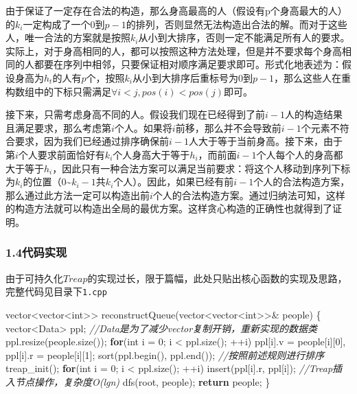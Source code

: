 \documentclass[]{article}
\newenvironment{Shaded}{}{}
\newcommand{\CommentTok}[1]{\textcolor[rgb]{0.38,0.63,0.69}{\textit{#1}}}
\newcommand{\ControlFlowTok}[1]{\textcolor[rgb]{0.00,0.44,0.13}{\textbf{#1}}}
\newcommand{\DataTypeTok}[1]{\textcolor[rgb]{0.56,0.13,0.00}{#1}}
\newcommand{\DecValTok}[1]{\textcolor[rgb]{0.25,0.63,0.44}{#1}}
\newcommand{\NormalTok}[1]{#1}
\begin{document}
由于保证了一定存在合法的构造，那么身高最高的人（假设有p个身高最大的人）的\(k_i\)一定构成了一个\(0\)到\(p-1\)的排列，否则显然无法构造出合法的解。而对于这些人，唯一合法的方案就是按照\(k_i\)从小到大排序，否则一定不能满足所有人的要求。实际上，对于身高相同的人，都可以按照这种方法处理，但是并不要求每个身高相同的人都要在序列中相邻，只要保证相对顺序满足要求即可。形式化地表述为：假设身高为\(h_t\)的人有\(p\)个，按照\(k_i\)从小到大排序后重标号为\(0\)到\(p-1\)，那么这些人在重构数组中的下标只需满足\(\forall{i < j},  pos(i) < pos(j)\)即可。

接下来，只需考虑身高不同的人。假设我们现在已经得到了前\(i-1\)人的构造结果且满足要求，那么考虑第\(i\)个人。如果将\(i\)前移，那么并不会导致前\(i-1\)个元素不符合要求，因为我们已经通过排序确保前\(i-1\)人大于等于当前身高。接下来，由于第\(i\)个人要求前面恰好有\(k_i\)个人身高大于等于\(h_i\)，而前面\(i-1\)个人每个人的身高都大于等于\(h_i\)，因此只有一种合法方案可以满足当前要求：将这个人移动到序列下标为\(k_i\)的位置（0\textasciitilde{}\(k_{i}-1\)共\(k_i\)个人）。因此，如果已经有前\(i-1\)个人的合法构造方案，那么通过此方法一定可以构造出前\(i\)个人的合法构造方案。通过归纳法可知，这样的构造方法就可以构造出全局的最优方案。这样贪心构造的正确性也就得到了证明。

\hypertarget{header-n53}{%
\subsubsection{1.4代码实现}\label{header-n53}}

由于可持久化\(Treap\)的实现过长，限于篇幅，此处只贴出核心函数的实现及思路，完整代码见目录下\texttt{1.cpp}

\begin{Shaded}
\begin{Highlighting}[]
\NormalTok{vector<vector<}\DataTypeTok{int}\NormalTok{>> reconstructQueue(vector<vector<}\DataTypeTok{int}\NormalTok{>>& people) \{}
\NormalTok{    vector<Data> ppl; }\CommentTok{//Data是为了减少vector复制开销，重新实现的数据类}
\NormalTok{    ppl.resize(people.size());}
    \ControlFlowTok{for}\NormalTok{(}\DataTypeTok{int}\NormalTok{ i = }\DecValTok{0}\NormalTok{; i < ppl.size(); ++i)}
\NormalTok{        ppl[i].v = people[i][}\DecValTok{0}\NormalTok{], ppl[i].r = people[i][}\DecValTok{1}\NormalTok{];}
\NormalTok{    sort(ppl.begin(), ppl.end()); }\CommentTok{//按照前述规则进行排序}
\NormalTok{    treap_init();}
    \ControlFlowTok{for}\NormalTok{(}\DataTypeTok{int}\NormalTok{ i = }\DecValTok{0}\NormalTok{; i < ppl.size(); ++i)}
\NormalTok{        insert(ppl[i].r, ppl[i]); }\CommentTok{//Treap插入节点操作，复杂度O(lgn)}
\NormalTok{    dfs(root, people);}
    \ControlFlowTok{return}\NormalTok{ people;}
\NormalTok{\}}
\end{Highlighting}
\end{Shaded}
\end{document}
